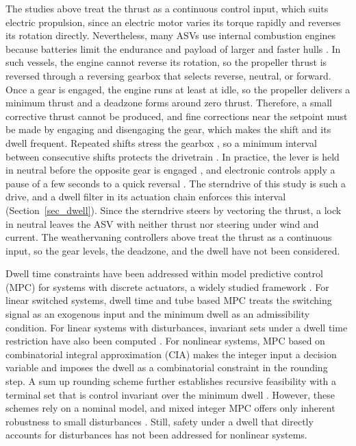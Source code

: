 \documentclass[lettersize,journal]{IEEEtran}
\begin{document}
The studies above treat the thrust as a continuous control input, which suits electric propulsion, since an electric motor varies its torque rapidly and reverses its rotation directly. Nevertheless, many ASVs use internal combustion engines because batteries limit the endurance and payload of larger and faster hulls \cite{zhuang2021highspeed,chiche2021rescue,han2020aragon}. In such vessels, the engine cannot reverse its rotation, so the propeller thrust is reversed through a reversing gearbox that selects reverse, neutral, or forward. Once a gear is engaged, the engine runs at least at idle, so the propeller delivers a minimum thrust and a deadzone forms around zero thrust. Therefore, a small corrective thrust cannot be produced, and fine corrections near the setpoint must be made by engaging and disengaging the gear, which makes the shift and its dwell frequent. Repeated shifts stress the gearbox \cite{lin2018clutch,chen2022engaging,choi2024crashastern}, so a minimum interval between consecutive shifts protects the drivetrain \cite{sun2024dwell}. In practice, the lever is held in neutral before the opposite gear is engaged \cite{mercruiser2017manual,volvopenta2007d4d6}, and electronic controls apply a pause of a few seconds to a quick reversal \cite{yanmar2025jh,zf2014clearcommand}. The sterndrive of this study is such a drive, and a dwell filter in its actuation chain enforces this interval (Section~\ref{sec_dwell}). Since the sterndrive steers by vectoring the thrust, a lock in neutral leaves the ASV with neither thrust nor steering under wind and current. The weathervaning controllers above treat the thrust as a continuous input, so the gear levels, the deadzone, and the dwell have not been considered.

Dwell time constraints have been addressed within model predictive control (MPC) for systems with discrete actuators, a widely studied framework \cite{bemporad1999mld,rawlings2017discrete,mcallister2022advances}. For linear switched systems, dwell time and tube based MPC \cite{zhang2016,vicente2019,zhuang2023} treats the switching signal as an exogenous input and the minimum dwell as an admissibility condition. For linear systems with disturbances, invariant sets under a dwell time restriction have also been computed \cite{dehghan2012}. For nonlinear systems, MPC based on combinatorial integral approximation (CIA) \cite{sager2011,buerger2019switched,zeile2021dwell} makes the integer input a decision variable and imposes the dwell as a combinatorial constraint in the rounding step. A sum up rounding scheme further establishes recursive feasibility with a terminal set that is control invariant over the minimum dwell \cite{chenlazar2022}. However, these schemes rely on a nominal model, and mixed integer MPC offers only inherent robustness to small disturbances \cite{mcallister2022advances}. Still, safety under a dwell that directly accounts for disturbances has not been addressed for nonlinear systems.
\end{document}
